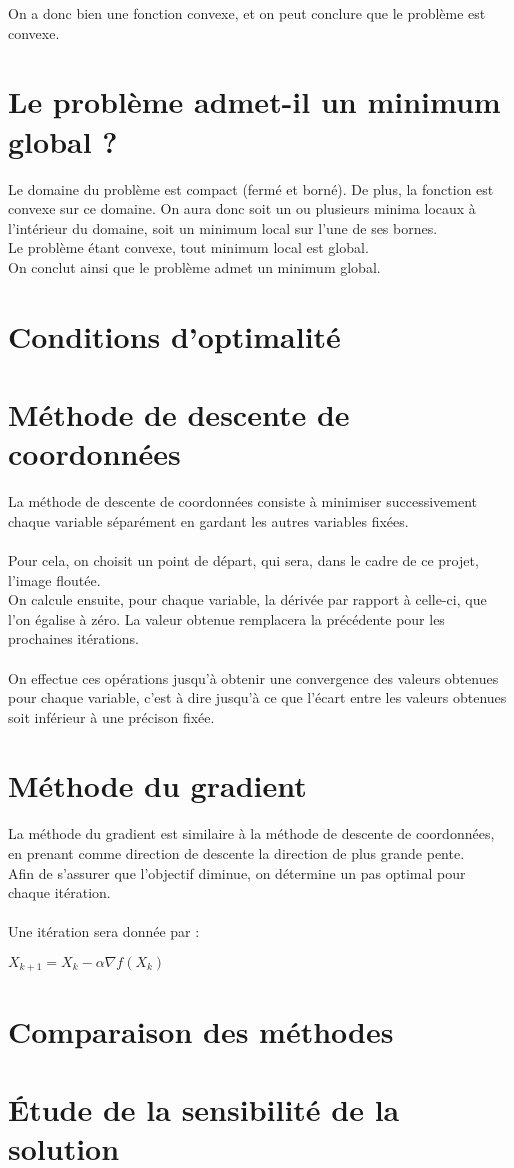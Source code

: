 \documentclass[12pt, a4paper]{report}
\begin{document}
\noindent
\newline
On a donc bien une fonction convexe, et on peut conclure que le problème est convexe.\\


\section{Le problème admet-il un minimum global ?}
Le domaine du problème est compact (fermé et borné). De plus, la fonction est convexe sur ce domaine. On aura donc soit un ou plusieurs minima locaux à l'intérieur du domaine, soit un minimum local sur l'une de ses bornes.\\
Le problème étant convexe, tout minimum local est global.\\
On conclut ainsi que le problème admet un minimum global.\\

\section{Conditions d'optimalité}

\section{Méthode de descente de coordonnées}
La méthode de descente de coordonnées consiste à minimiser successivement chaque variable séparément en gardant les autres variables fixées.\\
\\Pour cela, on choisit un point de départ, qui sera, dans le cadre de ce projet, l'image floutée.\\
On calcule ensuite, pour chaque variable, la dérivée par rapport à celle-ci, que l'on égalise à zéro. La valeur obtenue remplacera la précédente pour les prochaines itérations. \\
\\On effectue ces opérations jusqu'à obtenir une convergence des valeurs obtenues pour chaque variable, c'est à dire jusqu'à ce que l'écart entre les valeurs obtenues soit inférieur à une précison fixée.
\section{Méthode du gradient}
La méthode du gradient est similaire à la méthode de descente de coordonnées, en prenant comme direction de descente la direction de plus grande pente.\\
Afin de s'assurer que l'objectif diminue, on détermine un pas optimal pour chaque itération.\\
\\Une itération sera donnée par :
\begin{center}
$X_{k+1}=X_k - \alpha \nabla f(X_k)$
\end{center}

\section{Comparaison des méthodes}

\section{Étude de la sensibilité de la solution}
\end{document}
